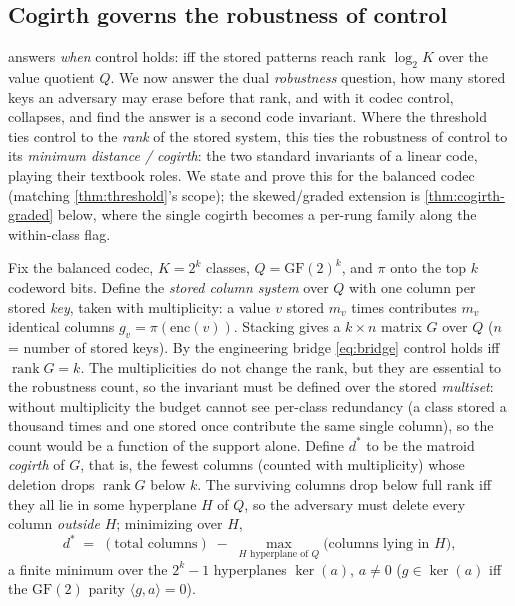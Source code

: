 \documentclass[acmsmall,review]{acmart}
\newcommand{\enc}{\mathrm{enc}}
\newcommand{\GF}{\mathrm{GF}(2)}
\DeclareMathOperator{\rank}{rank}
\newcommand{\proj}{\pi}                     %
\newcommand{\Quot}{Q}                       %
\begin{document}
\subsection{Cogirth governs the robustness of control}
\label{sec:t5b}

 answers \emph{when} control holds: iff the stored patterns reach rank
$\log_2 K$ over the value quotient $\Quot$. We now answer the dual \emph{robustness}
question, how many stored keys an adversary may erase before that rank, and with it codec
control, collapses, and find the answer is a second code invariant. Where the threshold
ties control to the \emph{rank} of the stored system, this ties the robustness of control
to its \emph{minimum distance / cogirth}: the two standard invariants of a linear code,
playing their textbook roles. We state and prove this for the balanced codec (matching
\cref{thm:threshold}'s scope); the skewed/graded extension is \cref{thm:cogirth-graded}
below, where the single cogirth becomes a per-rung family along the within-class flag.

Fix the balanced codec, $K = 2^k$ classes, $\Quot = \GF^k$, and $\proj$ onto the top $k$
codeword bits. Define the \emph{stored column system} over $\Quot$ with one column per
stored \emph{key}, taken with multiplicity: a value $v$ stored $m_v$ times contributes
$m_v$ identical columns $g_v = \proj(\enc(v))$. Stacking gives a $k \times n$ matrix $G$
over $\Quot$ ($n$ = number of stored keys). By the engineering bridge \eqref{eq:bridge}
control holds iff $\rank G = k$. The multiplicities do not change the rank, but they are
essential to the robustness count, so the invariant must be defined over the stored
\emph{multiset}: without multiplicity the budget cannot see per-class redundancy (a class
stored a thousand times and one stored once contribute the same single column), so the count
would be a function of the support alone. Define $d^\ast$ to be the matroid \emph{cogirth} of $G$, that is, the
fewest columns (counted with multiplicity) whose deletion drops $\rank G$ below $k$.
The surviving columns drop below full rank iff they all lie in some hyperplane $H$ of
$\Quot$, so the adversary must delete every column \emph{outside} $H$; minimizing over $H$,
\begin{equation}
  d^\ast \;=\; (\text{total columns}) \;-\; \max_{H \text{ hyperplane of } \Quot}
              \big(\text{columns lying in } H\big),
  \label{eq:cogirth}
\end{equation}
a finite minimum over the $2^k - 1$ hyperplanes $\ker(a)$, $a \ne 0$ ($g \in \ker(a)$ iff
the $\GF$ parity $\langle g, a\rangle = 0$).
\end{document}
